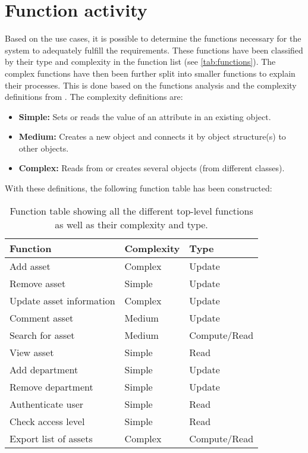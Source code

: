 \section{Function activity}\label{sc:function}
Based on the use cases, it is possible to determine the functions necessary for the system to adequately fulfill the requirements. These functions have been classified by their type and complexity in the function list (see \autoref{tab:functions}). The complex functions have then been further split into smaller functions to explain their processes. This is done based on the functions analysis and the complexity definitions from \cite[chap 7]{OOAD}. The complexity definitions are:

\begin{itemize}
    \item \textbf{Simple:} Sets or reads the value of an attribute in an existing object.
    \item \textbf{Medium:} Creates a new object and connects it by object structure(s) to other objects.
    \item \textbf{Complex:} Reads from or creates several objects (from different classes).
\end{itemize}

\newpage

With these definitions, the following function table has been constructed:

\begin{table}[H]
\centering
    \begin{tabular}{|l|l|l|}
        \hline
        \textbf{Function} & \textbf{Complexity} & \textbf{Type} \\
        \hline
        \hline
        Add asset & Complex & Update\\
        \hline
        Remove asset & Simple & Update\\
        \hline
        Update asset information & Complex & Update\\
        \hline
        Comment asset & Medium & Update\\
        \hline
        Search for asset & Medium & Compute/Read\\
        \hline
        View asset & Simple & Read\\
        \hline
        Add department & Simple & Update\\
        \hline
        Remove department & Simple & Update\\
        \hline
        Authenticate user & Simple & Read\\
        \hline
        Check access level & Simple & Read\\
        \hline
        Export list of assets & Complex & Compute/Read\\
        \hline
    \end{tabular}
\caption{Function table showing all the different top-level functions as well as their complexity and type.}\label{tab:functions}
\end{table}


